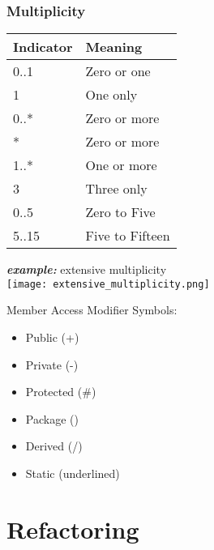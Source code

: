 \documentclass[a4paper]{article}
\newcommand{\textapprox}{\raisebox{0.5ex}{\texttildelow}}
\begin{document}
\subsubsection{Multiplicity}
\begin{table}[H]
	\centering
	\begin{tabular}{|l|l|}
		\hline
		\textbf{Indicator} & \textbf{Meaning} \\ \hline
		0..1               & Zero or one      \\ \hline
		1                  & One only         \\ \hline
		0..*               & Zero or more     \\ \hline
		*                  & Zero or more     \\ \hline
		1..*               & One or more      \\ \hline
		3                  & Three only       \\ \hline
		0..5               & Zero to Five     \\ \hline
		5..15              & Five to Fifteen  \\ \hline
	\end{tabular}
\end{table}
\begin{center}
	\textbf{\textit{example:}} extensive multiplicity\\
	\texttt{[image: extensive\_multiplicity.png]}
\end{center}
Member Access Modifier Symbols: 
\begin{itemize}
	\item Public (+)
	\item Private (-)
	\item Protected (\#)
	\item Package (\textapprox)
	\item Derived (/) 
	\item Static (underlined)
\end{itemize}
\section{Refactoring}
\end{document}
